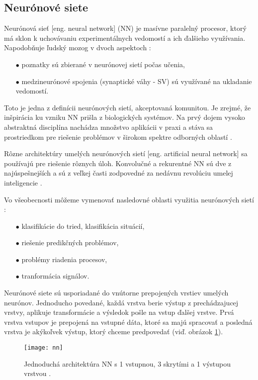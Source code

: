 \subsection{Neurónové siete}
\label{subsec:neuralnetworks}
Neurónová sieť [eng. neural network] (NN) je masívne paralelný procesor, ktorý má sklon k uchovávaniu experimentálnych vedomostí a ich ďalšieho využívania.
Napodobňuje ľudský mozog v dvoch aspektoch \cite{odkaz:NNIntroduction}:
\begin{enumerate}
	\item[$\bullet$] poznatky sú zbierané v neurónovej sietí počas učenia,
	\item[$\bullet$] medzineurónové spojenia (synaptické váhy - SV) sú využívané na ukladanie vedomostí.
\end{enumerate}
Toto je jedna z definícii neurónových sietí, akceptovaná komunitou.
Je zrejmé, že inšpirácia ku vzniku NN prišla z biologických systémov.
Na prvý dojem vysoko abstraktná disciplína nachádza množstvo aplikácii v praxi a stáva sa prostriedkom pre riešenie problémov v širokom spektre odborných oblastí \cite{odkaz:NNIntroduction}.

Rôzne architektúry umelých neurónových sietí [eng. artificial neural network] sa používajú pre riešenie rôznych úloh.
Konvolučné a rekurentné NN sú dve z najúspešnejších a sú z veľkej časti zodpovedné za nedávnu revolúciu umelej inteligencie \cite{odkaz:CorrectionOfImageOrentation}.

Vo všeobecnosti môžeme vymenovať nasledovné oblasti využitia neurónových sietí \cite{odkaz:NNIntroduction}:
\begin{enumerate}
    \item[$\bullet$] klasifikácie do tried, klasifikácia situácií,
    \item[$\bullet$] riešenie predikčných problémov,
    \item[$\bullet$] problémy riadenia procesov,
    \item[$\bullet$] tranformácia signálov.
\end{enumerate}

Neurónové siete sú usporiadané do vnútorne prepojených vrstiev umelých neurónov.
Jednoducho povedané, každá vrstva berie výstup z prechádzajucej vrstvy, aplikuje transformácie a výsledok pošle na vstup ďalšej vrstve.
Prvá vrstva vstupov je prepojená na vstupné dáta, ktoré sa majú spracovať a posledná vrstva je akýkoľvek výstup, ktorý chceme predpovedať \cite{odkaz:CorrectionOfImageOrentation} (viď. obrázok \ref{pic:NNExample}).
\begin{figure}[H]
	\centering
	\texttt{[image: nn]}
	\caption{Jednoduchá architektúra NN s 1 vstupnou, 3 skrytími a 1 výstupou vrstvou \cite{odkaz:CorrectionOfImageOrentation}.}
	\label{pic:NNExample}
\end{figure}

